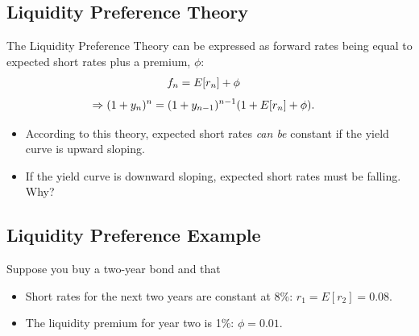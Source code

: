 \documentclass[letterpaper,10pt,english]{sphinxmanual}
\begin{document}
\subsection{Liquidity Preference Theory}
\label{termStructure:id8}
The Liquidity Preference Theory can be expressed as forward rates
being equal to expected short rates plus a premium, $\phi$:
\begin{gather}
\begin{split}f_n & = E[r_n] + \phi\end{split}\notag
\end{gather}\begin{gather}
\begin{split}\Rightarrow (1+y_n)^n & = (1+y_{n-1})^{n-1}(1+E[r_n] + \phi).\end{split}\notag
\end{gather}\begin{itemize}
\item {} 
According to this theory, expected short rates \emph{can be} constant if
the yield curve is upward sloping.

\end{itemize}
\begin{itemize}
\item {} 
If the yield curve is downward sloping, expected short rates must be
falling. Why?

\end{itemize}


\subsection{Liquidity Preference Example}
\label{termStructure:liquidity-preference-example}
Suppose you buy a two-year bond and that
\begin{itemize}
\item {} 
Short rates for the next two years are constant at 8\%: $r_1 =
E[r_2] = 0.08$.

\end{itemize}
\begin{itemize}
\item {} 
The liquidity premium for year two is 1\%: $\phi = 0.01$.

\end{itemize}
\end{document}
